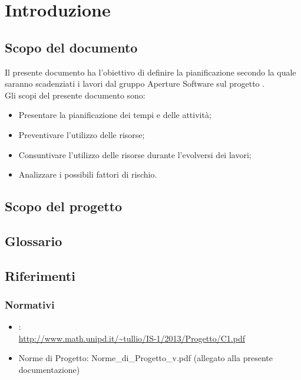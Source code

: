 \newpage
\section{Introduzione}
\label{2.0}
\subsection{Scopo del documento}
\label{2.1}
Il presente documento ha l'obiettivo di definire la pianificazione secondo la quale saranno scadenziati i lavori dal gruppo Aperture Software sul progetto \Progetto{}.\\

Gli scopi del presente documento sono:
\begin{itemize}
\item Presentare la pianificazione dei tempi e delle attività;
\item Preventivare l'utilizzo delle risorse;
\item Consuntivare l'utilizzo delle risorse durante l'evolversi dei lavori;
\item Analizzare i possibili fattori di rischio.
\end{itemize}

\subsection{Scopo del progetto}
\label{2.2}
\Prodotto{}

\subsection{Glossario}
\label{2.3}
\Glossario{}

\subsection{Riferimenti}
\label{2.4}
\subsubsection{Normativi}
\label{2.4.1}
\begin{itemize}
\item {}:\\ \url{http://www.math.unipd.it/~tullio/IS-1/2013/Progetto/C1.pdf}
\item Norme di Progetto: Norme\_{}di\_{}Progetto\_{}v\versioneNormeDiProgetto{}.pdf  (allegato alla presente documentazione)\\
\end{itemize}

